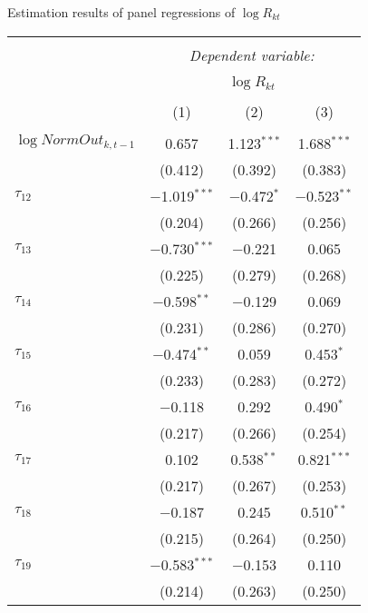   \caption{Estimation results of panel regressions of $\log R_{kt}$} 
  \label{} 
\small 
\begin{tabular}{@{\extracolsep{5pt}}lccc} 
\\[-1.8ex]\hline 
\hline \\[-1.8ex] 
 & \multicolumn{3}{c}{\textit{Dependent variable:}} \\ 
\cline{2-4} 
\\[-1.8ex] & \multicolumn{3}{c}{$\log R_{kt}$} \\ 
\\[-1.8ex] & (1) & (2) & (3)\\ 
\hline \\[-1.8ex] 
 $\log NormOut_{k,t-1}$ & 0.657 & 1.123$^{***}$ & 1.688$^{***}$ \\ 
  & (0.412) & (0.392) & (0.383) \\ 
   
 $\tau_{12}$ & $-$1.019$^{***}$ & $-$0.472$^{*}$ & $-$0.523$^{**}$ \\ 
  & (0.204) & (0.266) & (0.256) \\ 
   
 $\tau_{13}$ & $-$0.730$^{***}$ & $-$0.221 & 0.065 \\ 
  & (0.225) & (0.279) & (0.268) \\ 
   
 $\tau_{14}$ & $-$0.598$^{**}$ & $-$0.129 & 0.069 \\ 
  & (0.231) & (0.286) & (0.270) \\ 
   
 $\tau_{15}$ & $-$0.474$^{**}$ & 0.059 & 0.453$^{*}$ \\ 
  & (0.233) & (0.283) & (0.272) \\ 
   
 $\tau_{16}$ & $-$0.118 & 0.292 & 0.490$^{*}$ \\ 
  & (0.217) & (0.266) & (0.254) \\ 
   
 $\tau_{17}$ & 0.102 & 0.538$^{**}$ & 0.821$^{***}$ \\ 
  & (0.217) & (0.267) & (0.253) \\ 
   
 $\tau_{18}$ & $-$0.187 & 0.245 & 0.510$^{**}$ \\ 
  & (0.215) & (0.264) & (0.250) \\ 
   
 $\tau_{19}$ & $-$0.583$^{***}$ & $-$0.153 & 0.110 \\ 
  & (0.214) & (0.263) & (0.250) \\ 
   

\end{tabular}
